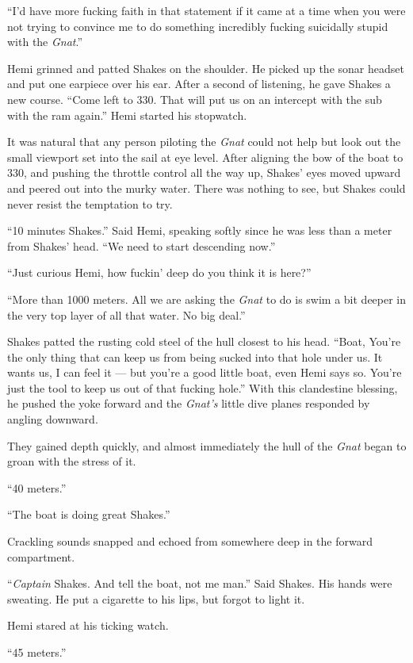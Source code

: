 \documentclass[]{scrbook}
\begin{document}
``I'd have more fucking faith in that statement if it came at a time
when you were not trying to convince me to do something incredibly
fucking suicidally stupid with the \emph{Gnat}.''

Hemi grinned and patted Shakes on the shoulder. He picked up the sonar
headset and put one earpiece over his ear. After a second of listening,
he gave Shakes a new course. ``Come left to 330. That will put us on an
intercept with the sub with the ram again.'' Hemi started his stopwatch.

It was natural that any person piloting the \emph{Gnat} could not help
but look out the small viewport set into the sail at eye level. After
aligning the bow of the boat to 330, and pushing the throttle control
all the way up, Shakes' eyes moved upward and peered out into the murky
water. There was nothing to see, but Shakes could never resist the
temptation to try.

``10 minutes Shakes.'' Said Hemi, speaking softly since he was less than
a meter from Shakes' head. ``We need to start descending now.''

``Just curious Hemi, how fuckin' deep do you think it is here?''

``More than 1000 meters. All we are asking the \emph{Gnat} to do is swim
a bit deeper in the very top layer of all that water. No big deal.''

Shakes patted the rusting cold steel of the hull closest to his head.
``Boat, You're the only thing that can keep us from being sucked into
that hole under us. It wants us, I can feel it --- but you're a good
little boat, even Hemi says so. You're just the tool to keep us out of
that fucking hole.'' With this clandestine blessing, he pushed the yoke
forward and the \emph{Gnat's} little dive planes responded by angling
downward.

They gained depth quickly, and almost immediately the hull of the
\emph{Gnat} began to groan with the stress of it.

``40 meters.''

``The boat is doing great Shakes.''

Crackling sounds snapped and echoed from somewhere deep in the forward
compartment.

``\emph{Captain} Shakes. And tell the boat, not me man.'' Said Shakes.
His hands were sweating. He put a cigarette to his lips, but forgot to
light it.

Hemi stared at his ticking watch.

``45 meters.''
\end{document}
